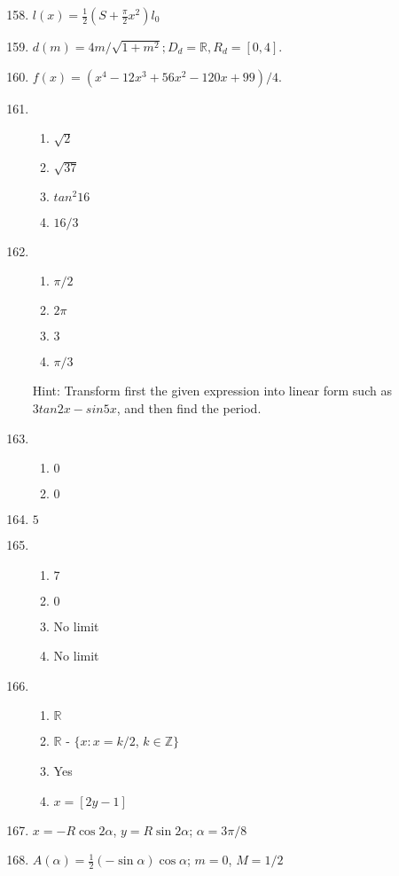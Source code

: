 \documentclass[11pt]{amsbook}
\begin{document}
\begin{enumerate}
\setcounter{enumi}{157}
\item $l(x) = \frac{1}{2}(S + \frac{\pi}{2}x^2)l_0$
\addtocounter{enumi}{1}
\item $d(m) = 4m/\sqrt{1 + m^2};  D_d = \mathbb{R},  R_d = [0, 4]$.
\addtocounter{enumi}{1}
\item $f(x) = (x^4 - 12x^3 + 56x^2 - 120x + 99)/4$.
\addtocounter{enumi}{1}
\item 
\begin{enumerate}
	\item $\sqrt{2}$
	\item $\sqrt{37}$
	\item $tan^2 16$
	\item $16/3$
\end{enumerate}
\addtocounter{enumi}{1}
\item
\begin{enumerate}
	\item $\pi/2$
	\item $2\pi$
	\item $3$
	\item $\pi/3$
\end{enumerate}
Hint: Transform first the given expression into linear form such as $3tan2x - sin5x$, and then find the period.
\addtocounter{enumi}{1}
\item
\begin{enumerate}
	\item $0$
	\item $0$
\end{enumerate}
\addtocounter{enumi}{1}
\item $5$
\addtocounter{enumi}{1}
\item
\begin{enumerate}
	\item $7$
	\item $0$
	\item No limit
	\item No limit
\end{enumerate}
\addtocounter{enumi}{1}
\item
\begin{enumerate}
	\item $\mathbb{R}$
	\item $\mathbb{R}$ - $\{x: x = k/2$, $k\in\mathbb{Z}\}$
	\item Yes
	\item $x = [2y - 1]$
\end{enumerate}
\addtocounter{enumi}{1}

\item 
$x = -R \cos 2 \alpha$, 
$y = R \sin 2 \alpha$; 
$\alpha = 3 \pi / 8$
\addtocounter{enumi}{1}

\item 
$A(\alpha) = \frac{1}{2} (- \sin \alpha) \cos \alpha$; 
$m = 0$, 
$M = 1/2$
\end{enumerate}
\end{document}
